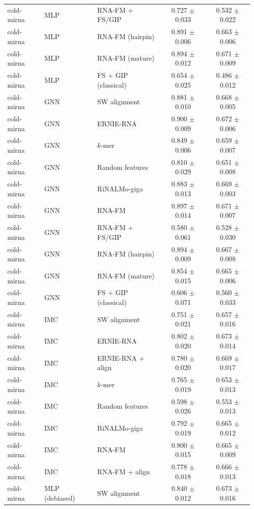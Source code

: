 \begin{longtable}{lllcc}
cold-mirna & MLP & RNA-FM + FS/GIP & 0.727 $\pm$ 0.033 & 0.532 $\pm$ 0.022\\
cold-mirna & MLP & RNA-FM (hairpin) & 0.891 $\pm$ 0.006 & 0.663 $\pm$ 0.006\\
cold-mirna & MLP & RNA-FM (mature) & 0.894 $\pm$ 0.012 & 0.671 $\pm$ 0.009\\
cold-mirna & MLP & FS + GIP (classical) & 0.654 $\pm$ 0.025 & 0.486 $\pm$ 0.012\\
cold-mirna & GNN & SW alignment & 0.881 $\pm$ 0.010 & 0.668 $\pm$ 0.005\\
cold-mirna & GNN & ERNIE-RNA & 0.900 $\pm$ 0.009 & 0.672 $\pm$ 0.006\\
cold-mirna & GNN & $k$-mer & 0.849 $\pm$ 0.006 & 0.659 $\pm$ 0.007\\
cold-mirna & GNN & Random features & 0.810 $\pm$ 0.029 & 0.651 $\pm$ 0.008\\
cold-mirna & GNN & RiNALMo-giga & 0.883 $\pm$ 0.013 & 0.669 $\pm$ 0.003\\
cold-mirna & GNN & RNA-FM & 0.897 $\pm$ 0.014 & 0.671 $\pm$ 0.007\\
cold-mirna & GNN & RNA-FM + FS/GIP & 0.580 $\pm$ 0.061 & 0.528 $\pm$ 0.030\\
cold-mirna & GNN & RNA-FM (hairpin) & 0.894 $\pm$ 0.009 & 0.667 $\pm$ 0.008\\
cold-mirna & GNN & RNA-FM (mature) & 0.854 $\pm$ 0.015 & 0.665 $\pm$ 0.006\\
cold-mirna & GNN & FS + GIP (classical) & 0.606 $\pm$ 0.071 & 0.560 $\pm$ 0.033\\
cold-mirna & IMC & SW alignment & 0.751 $\pm$ 0.021 & 0.657 $\pm$ 0.016\\
cold-mirna & IMC & ERNIE-RNA & 0.802 $\pm$ 0.020 & 0.673 $\pm$ 0.014\\
cold-mirna & IMC & ERNIE-RNA + align & 0.780 $\pm$ 0.020 & 0.669 $\pm$ 0.017\\
cold-mirna & IMC & $k$-mer & 0.765 $\pm$ 0.019 & 0.653 $\pm$ 0.013\\
cold-mirna & IMC & Random features & 0.598 $\pm$ 0.026 & 0.553 $\pm$ 0.013\\
cold-mirna & IMC & RiNALMo-giga & 0.792 $\pm$ 0.019 & 0.665 $\pm$ 0.012\\
cold-mirna & IMC & RNA-FM & 0.800 $\pm$ 0.015 & 0.665 $\pm$ 0.009\\
cold-mirna & IMC & RNA-FM + align & 0.778 $\pm$ 0.018 & 0.666 $\pm$ 0.013\\
cold-mirna & MLP (debiased) & SW alignment & 0.840 $\pm$ 0.012 & 0.673 $\pm$ 0.016\\

\end{longtable}
